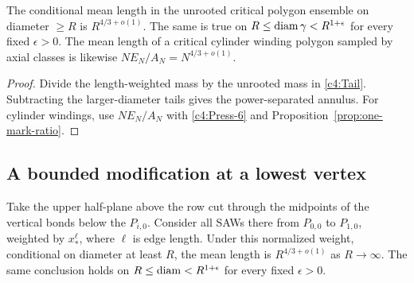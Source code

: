 \begin{corollary}\label{cor:polygon-means}
The conditional mean length in the unrooted critical polygon ensemble
on diameter $\ge R$ is $R^{4/3+o(1)}$. The same is true on
$R\le\operatorname{diam}\gamma<R^{1+\epsilon}$ for every fixed $\epsilon>0$.
The mean length of a critical cylinder winding polygon sampled by
axial classes is likewise $NE_N/A_N=N^{4/3+o(1)}$.
\end{corollary}

\begin{proof}
Divide the length-weighted mass by the unrooted mass in
\eqref{c4:Tail}. Subtracting the larger-diameter tails gives the
power-separated annulus. For cylinder windings, use $NE_N/A_N$ with
\eqref{c4:Press-6} and Proposition~\ref{prop:one-mark-ratio}.
\end{proof}

\subsection{A bounded modification at a lowest vertex}

\begin{corollary}
\label{cor:boundary-neighbor-mean}
Take the upper half-plane above the row cut through the midpoints of
the vertical bonds below the $P_{i,0}$. Consider all SAWs there from
$P_{0,0}$ to $P_{1,0}$, weighted by $x_*^\ell$, where $\ell$ is edge
length. Under this normalized weight, conditional on diameter at least
$R$, the mean length is $R^{4/3+o(1)}$ as $R\to\infty$. The same
conclusion holds on $R\le\operatorname{diam}<R^{1+\epsilon}$ for every fixed
$\epsilon>0$.
\end{corollary}

